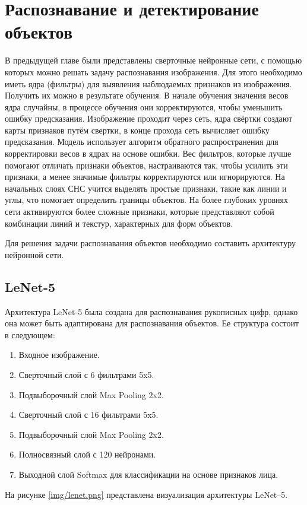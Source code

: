 \chapter{Распознавание и детектирование объектов}
В предыдущей главе были представлены сверточные нейронные сети, с помощью которых можно решать задачу распознавания изображения. Для этого необходимо иметь ядра (фильтры) для выявления наблюдаемых признаков из изображения. Получить их можно в результате обучения. В начале обучения значения весов ядра случайны, в процессе обучения они корректируются, чтобы уменьшить ошибку предсказания. Изображение проходит через сеть, ядра свёртки создают карты признаков  путём свертки, в конце прохода сеть вычисляет ошибку предсказания. Модель использует алгоритм обратного распространения для корректировки весов в ядрах на основе ошибки. Вес фильтров, которые лучше помогают отличать признаки объектов, настраиваются так, чтобы усилить эти признаки, а менее значимые фильтры корректируются или игнорируются. На начальных слоях СНС учится выделять простые признаки, такие как линии и углы, что помогает определить границы объектов. На более глубоких уровнях сети активируются более сложные признаки, которые представляют собой комбинации линий и текстур, характерных для форм объектов.

Для решения задачи распознавания объектов необходимо составить архитектуру нейронной сети.

\section{LeNet-5}
Архитектура LeNet-5 была создана для распознавания рукописных цифр, однако она может быть адаптирована для распознавания объектов. Ее структура состоит в следующем:
\begin{enumerate}
\item Входное изображение.
\item Сверточный слой с 6 фильтрами 5x5.
\item Подвыборочный слой Max Pooling 2x2.
\item Сверточный слой с 16 фильтрами 5x5.
\item Подвыборочный слой Max Pooling 2x2.
\item Полносвязный слой с 120 нейронами.
\item Выходной слой Softmax для классификации на основе признаков лица.
\end{enumerate}

На рисунке \ref{img/lenet.png} представлена визуализация архитектуры LeNet--5.

